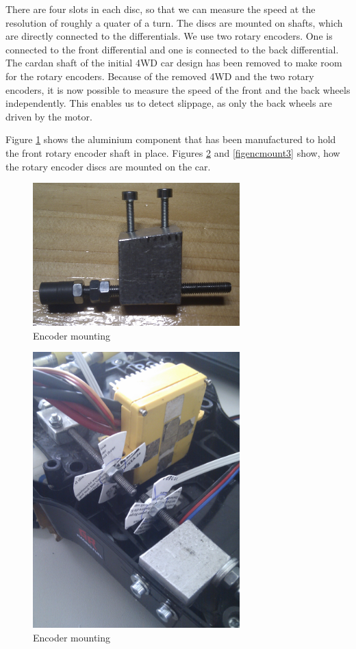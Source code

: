 \documentclass[12pt]{article}
\begin{document}
There are four slots in each disc, so that we can measure the speed at the resolution of roughly a quater of a turn.
The discs are mounted on shafts, which are directly connected to the differentials.
We use two rotary encoders.
One is connected to the front differential and one is connected to the back differential.
The cardan shaft of the initial 4WD car design has been removed to make room for the rotary encoders.
Because of the removed 4WD and the two rotary encoders, it is now possible to measure the speed of the front and the back wheels independently.
This enables us to detect slippage, as only the back wheels are driven by the motor.

Figure \ref{figencmount1} shows the aluminium component that has been manufactured to hold the front rotary encoder shaft in place.
Figures \ref{figencmount2} and \ref{figencmount3} show, how the rotary encoder discs are mounted on the car.

\begin{figure}[h]
\begin{center}
\includegraphics[width=8cm]{pic/encoder_mount.png}
\caption{Encoder mounting}
\end{center}
\label{figencmount1}
\end{figure}

\begin{figure}[h]
\begin{center}
\includegraphics[width=8cm]{pic/encoders_scheiben.jpg}
\caption{Encoder mounting}
\end{center}
\label{figencmount2}
\end{figure}
\end{document}
